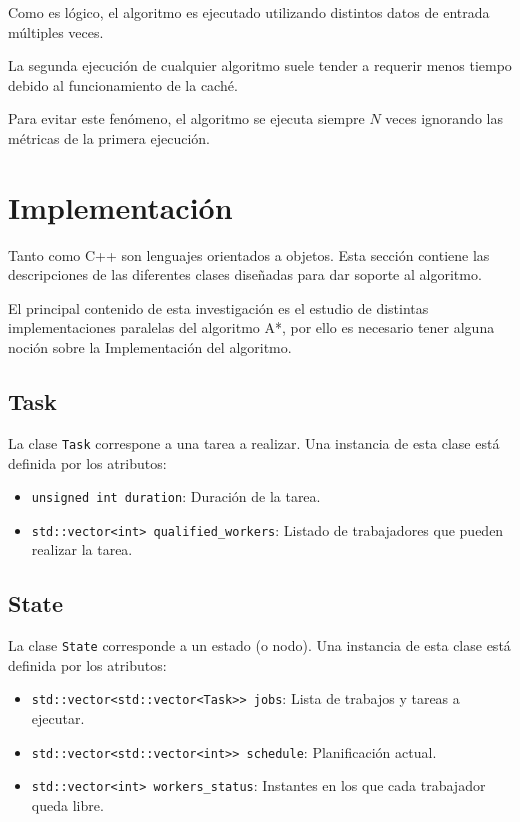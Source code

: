 Como es lógico, el algoritmo es ejecutado utilizando
distintos datos de entrada múltiples veces.

\begin{notebox}
    La segunda ejecución de cualquier algoritmo suele tender a
    requerir menos tiempo debido al funcionamiento de la caché.
    
    Para evitar este fenómeno, el algoritmo se ejecuta
    siempre $N$ veces ignorando las métricas de la primera ejecución.
\end{notebox}

\pagebreak
\section{Implementación}

Tanto \Python como C++ son lenguajes orientados a objetos.
Esta sección contiene las descripciones de las diferentes
clases diseñadas para dar soporte al algoritmo.

\begin{notebox}
El principal contenido de esta investigación es el estudio
de distintas implementaciones paralelas del algoritmo A*,
por ello es necesario tener alguna noción sobre la Implementación
del algoritmo.
\end{notebox}

\subsection{Task}

La clase \lstinline{Task} correspone a una tarea a realizar.
Una instancia de esta clase está definida por los atributos:
\begin{itemize}[itemsep=0.25px]
    \item \lstinline{unsigned int duration}: Duración de la tarea.
    \item \lstinline{std::vector<int> qualified_workers}: Listado de trabajadores que pueden realizar la tarea.
\end{itemize}

\subsection{State}

La clase \lstinline{State} corresponde a un estado (o nodo).
Una instancia de esta clase está definida por los atributos:
\begin{itemize}[itemsep=0.25px]
    \item \lstinline{std::vector<std::vector<Task>> jobs}: Lista de trabajos y tareas a ejecutar.
    \item \lstinline{std::vector<std::vector<int>> schedule}: Planificación actual.
    \item \lstinline{std::vector<int> workers_status}: Instantes en los que cada trabajador queda libre.
\end{itemize}

